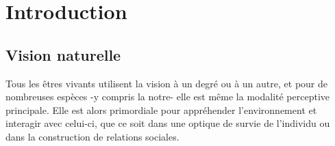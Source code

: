 
\chapter{Introduction} %
\label{Introduction} %


\newcommand{\keyword}[1]{\textbf{#1}}
\newcommand{\tabhead}[1]{\textbf{#1}}
\newcommand{\code}[1]{\texttt{#1}}
\newcommand{\file}[1]{\texttt{\bfseries#1}}
\newcommand{\option}[1]{\texttt{\itshape#1}}


\section{Vision naturelle}
Tous  les êtres vivants utilisent la vision à un degré ou à un autre, et pour de nombreuses espèces -y compris la notre- elle est même la modalité perceptive principale. Elle est alors primordiale pour appréhender l'environnement et interagir avec celui-ci, que ce soit dans une optique de survie de l'individu ou dans la construction de relations sociales.\\

